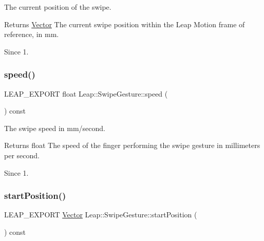The current position of the swipe.


\begin{DoxyCodeInclude}
\end{DoxyCodeInclude}


\begin{DoxyReturn}{Returns}
\hyperlink{struct_leap_1_1_vector}{Vector} The current swipe position within the Leap Motion frame of reference, in mm. 
\end{DoxyReturn}
\begin{DoxySince}{Since}
1. 
\end{DoxySince}
\mbox{\label{class_leap_1_1_swipe_gesture_af1f1f368f0a29c2a32f4a8b39a0594e3}} 
\subsubsection{\texorpdfstring{speed()}{speed()}}
{\footnotesize\ttfamily L\+E\+A\+P\+\_\+\+E\+X\+P\+O\+RT float Leap\+::\+Swipe\+Gesture\+::speed (\begin{DoxyParamCaption}{ }\end{DoxyParamCaption}) const}

The swipe speed in mm/second.


\begin{DoxyCodeInclude}
\end{DoxyCodeInclude}


\begin{DoxyReturn}{Returns}
float The speed of the finger performing the swipe gesture in millimeters per second. 
\end{DoxyReturn}
\begin{DoxySince}{Since}
1. 
\end{DoxySince}
\mbox{\label{class_leap_1_1_swipe_gesture_ad3419098e633523cdc5e4d7e60249f95}} 
\subsubsection{\texorpdfstring{start\+Position()}{startPosition()}}
{\footnotesize\ttfamily L\+E\+A\+P\+\_\+\+E\+X\+P\+O\+RT \hyperlink{struct_leap_1_1_vector}{Vector} Leap\+::\+Swipe\+Gesture\+::start\+Position (\begin{DoxyParamCaption}{ }\end{DoxyParamCaption}) const}

